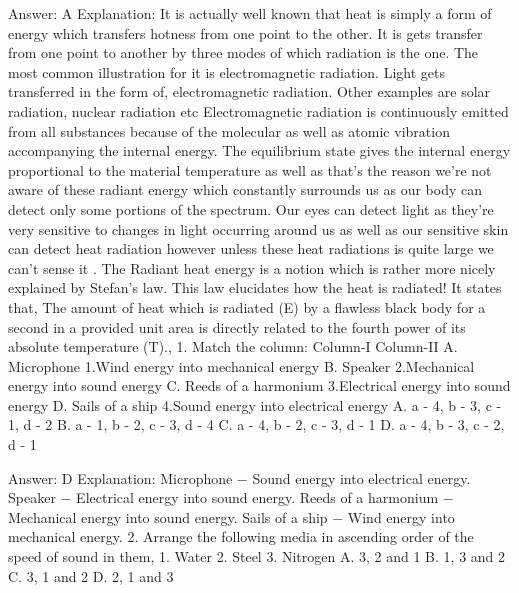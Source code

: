 Answer: A
Explanation: It is actually well known that heat is simply a form of energy which transfers hotness from one point to the other. It is gets transfer from one point to another by three modes of which radiation is the one. The most common illustration for it is electromagnetic radiation. Light gets transferred in the form of,  electromagnetic radiation. Other examples are solar radiation, nuclear radiation etc Electromagnetic radiation is continuously emitted from all substances because of the molecular as well as atomic vibration accompanying the internal energy. The equilibrium state gives the internal energy proportional to the material temperature as well as that’s the reason we’re not aware of these radiant energy which constantly surrounds us as our body can detect only some portions of the spectrum. Our eyes can detect light as they’re very sensitive to changes in light occurring around us as well as our sensitive skin can detect heat radiation however unless these heat radiations is quite large we can’t sense it . The Radiant heat energy is a notion which is rather more nicely explained by Stefan’s law. This law elucidates how the heat is radiated! It states that, The amount of heat which is radiated (E) by a flawless black body for a second in a provided unit area is directly related to the fourth power of its absolute temperature (T).,  1. Match the column: Column-I Column-II A. Microphone 1.Wind energy into mechanical energy B. Speaker 2.Mechanical energy into sound energy C. Reeds of a harmonium 3.Electrical energy into sound energy D. Sails of a ship 4.Sound energy into electrical energy A. a - 4, b - 3, c - 1, d - 2 B. a - 1, b - 2, c - 3, d - 4 C. a - 4, b - 2, c - 3, d - 1 D. a - 4, b - 3, c - 2, d - 1 

Answer: D
Explanation: Microphone − Sound energy into electrical energy. Speaker − Electrical energy into sound energy. Reeds of a harmonium − Mechanical energy into sound energy. Sails of a ship − Wind energy into mechanical energy. 2. Arrange the following media in ascending order of the speed of sound in them, 1. Water 2. Steel 3. Nitrogen A. 3, 2 and 1 B. 1, 3 and 2 C. 3, 1 and 2 D. 2, 1 and 3 


